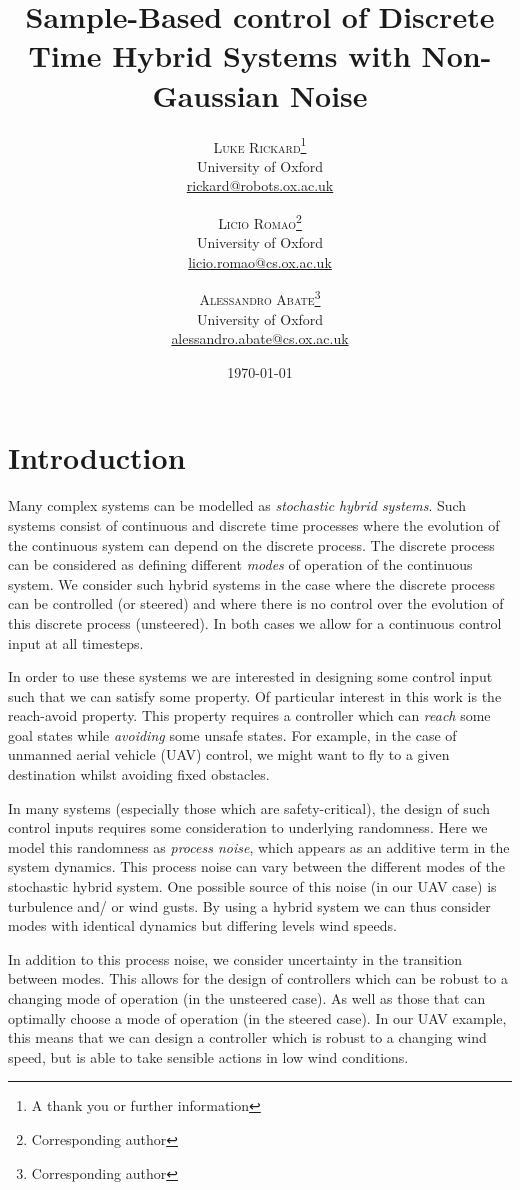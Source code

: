 \documentclass[twoside,twocolumn]{article}
\title{Sample-Based control of Discrete Time Hybrid Systems with Non-Gaussian Noise} %
\author{%
\textsc{Luke Rickard}\thanks{A thank you or further information} \\[1ex] %
\normalsize University of Oxford \\ %
\normalsize \href{mailto:rickard@robots.ox.ac.uk}{rickard@robots.ox.ac.uk} %
\and %
\textsc{Licio Romao}\thanks{Corresponding author} \\[1ex] %
\normalsize University of Oxford \\ %
\normalsize \href{mailto:licio.romao@cs.ox.ac.uk}{licio.romao@cs.ox.ac.uk} %
\and %
\textsc{Alessandro Abate}\thanks{Corresponding author} \\[1ex] %
\normalsize University of Oxford \\ %
\normalsize \href{mailto:alessandro.abate@cs.ox.ac.uk}{alessandro.abate@cs.ox.ac.uk} %
}
\date{\today} %
\begin{document}
\maketitle

\section{Introduction}
Many complex systems can be modelled as \emph{stochastic hybrid systems}. Such systems consist of continuous and discrete time processes where the evolution of the continuous system can depend on the discrete process. The discrete process can be considered as defining different \emph{modes} of operation of the continuous system. We consider such hybrid systems in the case where the discrete process can be controlled (or steered) and where there is no control over the evolution of this discrete process (unsteered). In both cases we allow for a continuous control input at all timesteps.

In order to use these systems we are interested in designing some control input such that we can satisfy some property. Of particular interest in this work is the reach-avoid property. This property requires a controller which can \emph{reach} some goal states while \emph{avoiding} some unsafe states. For example, in the case of unmanned aerial vehicle (UAV) control, we might want to fly to a given destination whilst avoiding fixed obstacles.

In many systems (especially those which are safety-critical), the design of such control inputs requires some consideration to underlying randomness. Here we model this randomness as \emph{process noise}, which appears as an additive term in the system dynamics. This process noise can vary between the different modes of the stochastic hybrid system. One possible source of this noise (in our UAV case) is turbulence and/ or wind gusts. By using a hybrid system we can thus consider modes with identical dynamics but differing levels wind speeds.

In addition to this process noise, we consider uncertainty in the transition between modes. This allows for the design of controllers which can be robust to a changing mode of operation (in the unsteered case). As well as those that can optimally choose a mode of operation (in the steered case). In our UAV example, this means that we can design a controller which is robust to a changing wind speed, but is able to take sensible actions in low wind conditions.
\end{document}
